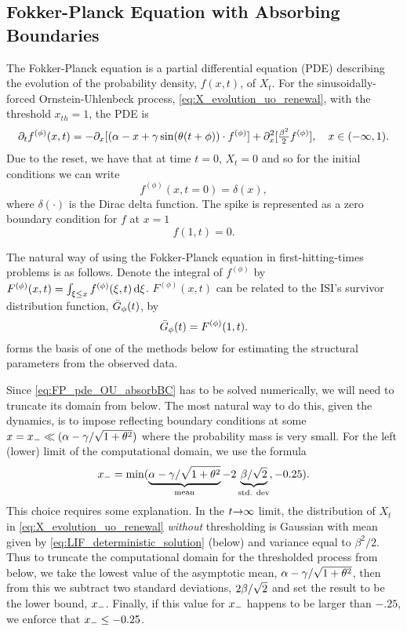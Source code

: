 \subsection{Fokker-Planck Equation with Absorbing Boundaries}
\label{sec:fp_estimation}
The Fokker-Planck equation is a partial differential equation (PDE) describing
the evolution of the probability density, $f(x,t)$, of $X_t$. 
For the sinusoidally-forced Ornstein-Uhlenbeck process,
\cref{eq:X_evolution_uo_renewal}, with the threshold $x_{th} = 1$, the PDE is
\begin{equation}
{\partial}_t f^{(\phi)}(x,t) = -{\partial}_x[(\alpha - x + {\gamma } \sin({ \theta} (t + \phi))\cdot
f^{(\phi)}] +{\partial}^2_x[ \tfrac{\beta^2}{2}f^{(\phi)}], \quad x \in (-\infty,
1).
\label{eq:FP_pde_OU_absorbBC}
\end{equation}
Due to the reset, we have that at time $t=0$, $X_t=0$  and so for the initial
conditions we can write
\begin{equation}
f^{(\phi)}(x,t=0) = \delta(x) ,
\label{eq:PDF_ICs}
\end{equation}
where $\delta(\cdot)$ is the Dirac delta function. The spike is represented as
a zero boundary condition for $f$ at $x = 1$ $$
f(1, t) =0.
$$

The natural way of using the Fokker-Planck equation in first-hitting-times
problems is as follows. Denote the integral of $f^{(\phi)}$ by $F^{(\phi)}(x,t)
= \int_{\xi \leq x} f^{(\phi)}(\xi, t) \, \mathrm{d} \xi$. $F^{(\phi)}(x,t)$ can be
related to the ISI's survivor distribution function, ${ \bar{G} }_{\phi}(t)$, by
\begin{equation}
{ \bar{G} }_{\phi}(t) = F^{(\phi)}(1,t).
\label{eq:SDF_vs_F_at_thresh}
\end{equation}
 forms the
basis of one of the methods below for estimating the structural parameters from
the observed data.

Since \cref{eq:FP_pde_OU_absorbBC} has to be solved numerically, we will need to
truncate its domain from below. The most natural way to do this, given the
dynamics, is to impose reflecting boundary conditions at some $x={ x_{-} } \ll
(\alpha-{\gamma }/\sqrt{1+{ \theta}^2})$ where the probability mass is very small. For the left
(lower) limit of the computational domain, we use the formula $$ { x_{-} } =
\min(\underbrace{\alpha -{\gamma }/\sqrt{1+{ \theta}^2}}_{\textrm{mean}} - 2 \underbrace{\beta/
\sqrt{2}}_{\textrm{std. dev}}, -0.25).$$ This choice requires some explanation.
In the $t{\rightarrow} \infty$ limit, the distribution of $X_t$ in
\cref{eq:X_evolution_uo_renewal} {\sl without} thresholding is Gaussian with
mean given by \cref{eq:LIF_deterministic_solution} (below) and variance equal to
$\beta^2/2$. Thus to truncate the computational
domain for the thresholded process from below, we take the lowest value of
the asymptotic mean, $\alpha - \gamma / \sqrt{1 + { \theta}^2}$, then from
this we subtract two standard deviations, $2\beta/\sqrt{2}$ and set the result to be the lower
bound, ${ x_{-} }$. Finally, if this value for ${ x_{-} }$ happens to be larger than
$-.25$, we enforce that  ${ x_{-} } \leq -0.25$. 


